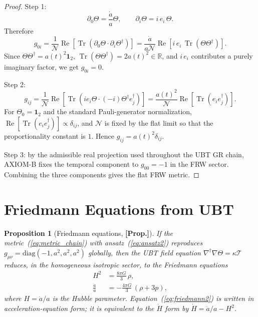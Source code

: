 \documentclass[12pt,a4paper]{article}
\newtheorem{proposition}[theorem]{Proposition}
\begin{document}
\begin{proof}
Step 1:
\[
\partial_0\Theta=\frac{\dot a}{a}\Theta,\qquad
\partial_i\Theta=i\,e_i\,\Theta.
\]
Therefore
\[
g_{0i}
=\frac{1}{\mathcal N}\operatorname{Re}\!\left[
\operatorname{Tr}\!\left(\partial_0\Theta\cdot\partial_i\Theta^\dagger\right)\right]
=\frac{\dot a}{a\mathcal N}\operatorname{Re}\!\left[
i\,e_i\,\operatorname{Tr}(\Theta\Theta^\dagger)\right].
\]
Since \(\Theta\Theta^\dagger=a(t)^2\mathbf{1}_2\),
\(\operatorname{Tr}(\Theta\Theta^\dagger)=2a(t)^2\in\mathbb{R}\),
and \(i\,e_i\) contributes a purely imaginary factor, we get \(g_{0i}=0\).

Step 2:
\[
g_{ij}
=\frac{1}{\mathcal N}\operatorname{Re}\!\left[
\operatorname{Tr}\!\left(i e_i\Theta\cdot(-i)\Theta^\dagger e_j^\dagger\right)\right]
=\frac{a(t)^2}{\mathcal N}\operatorname{Re}\!\left[
\operatorname{Tr}(e_i e_j^\dagger)\right].
\]
For \(\Theta_0=\mathbf{1}_2\) and the standard Pauli-generator normalization,
\(\operatorname{Re}[\operatorname{Tr}(e_i e_j^\dagger)]\propto\delta_{ij}\), and
\(\mathcal N\) is fixed by the flat limit so that the proportionality constant is \(1\).
Hence \(g_{ij}=a(t)^2\delta_{ij}\).

Step 3: by the admissible real projection used throughout the UBT GR chain,
AXIOM-B fixes the temporal component to \(g_{00}=-1\) in the FRW sector.
Combining the three components gives the flat FRW metric.
\end{proof}

\section{Friedmann Equations from UBT}
\label{sec:friedmann}

\begin{proposition}[Friedmann equations, \textbf{[Prop.]}]
\label{prop:friedmann}
If the metric~(\ref{eq:metric_chain}) with ansatz~(\ref{eq:ansatz2})
reproduces $g_{\mu\nu} = \mathrm{diag}(-1, a^2, a^2, a^2)$ globally,
then the UBT field equation $\nabla^\dagger\nabla\Theta = \kappa\mathcal{T}$
reduces, in the homogeneous isotropic sector, to the Friedmann equations
\begin{align}
  \label{eq:friedmann1}
  H^2 &= \frac{8\pi G}{3}\,\rho, \\
  \label{eq:friedmann2}
  \frac{\ddot a}{a} &= -\frac{4\pi G}{3}\,(\rho + 3p),
\end{align}
where $H = \dot a/a$ is the Hubble parameter.
Equation~(\ref{eq:friedmann2}) is written in acceleration-equation form;
it is equivalent to the $\dot H$ form by $\dot H = \ddot a/a - H^2$.
\end{proposition}
\end{document}
